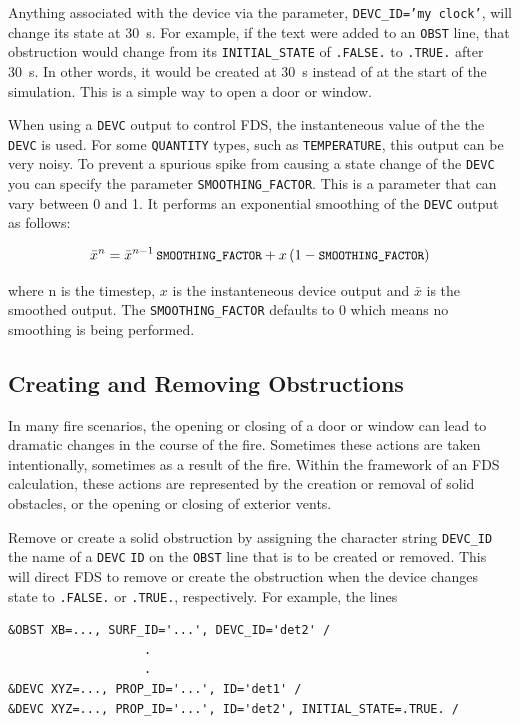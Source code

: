 \documentclass[11pt]{book}
\newcommand{\ct}{\tt\small}
\newcommand{\be}{\begin{equation}}
\newcommand{\ee}{\end{equation}}
\begin{document}
\noindent
Anything associated with the device via the parameter, {\ct DEVC\_ID='my clock'}, will change its state at 30~s. For example,
if the text were added to an {\ct OBST} line, that obstruction would change from its {\ct INITIAL\_STATE} of {\ct .FALSE.} to {\ct .TRUE.} after
30~s. In other words, it would be created at 30~s instead of at the start of the simulation. This is a simple way to open a door or window.

When using a {\ct DEVC} output to control FDS, the instanteneous value of the the {\ct DEVC} is used.  For some {\ct QUANTITY} types, such as {\ct TEMPERATURE}, this output can be very noisy.  To prevent a spurious spike from causing a state change of the {\ct DEVC} you can specify the parameter {\ct SMOOTHING\_FACTOR}.  This is a parameter that can vary between 0 and 1.  It performs an exponential smoothing of the {\ct DEVC} output as follows:

\be
\bar{x}^n=\bar{x}^{n-1} \, \mbox{\ct SMOOTHING\_FACTOR} + x \,(1-\mbox{\ct SMOOTHING\_FACTOR})
\ee

\noindent
where n is the timestep, $x$ is the instanteneous device output and $\bar{x}$ is the smoothed output.  The {\ct SMOOTHING\_FACTOR} defaults to 0 which means no smoothing is being performed.

\subsection{Creating and Removing Obstructions}
\label{info:create_remove}

In many fire scenarios, the opening or closing of a door or window
can lead to dramatic changes in the course of the fire. Sometimes these
actions are taken intentionally, sometimes as a result of the fire.
Within the framework of an FDS calculation, these actions are
represented by the creation or removal of solid obstacles, or the
opening or closing of exterior vents.

Remove or create a solid obstruction by assigning the character string {\ct DEVC\_ID} the name of
a {\ct DEVC} {\ct ID} on the {\ct OBST} line that is to be created or removed.  This will direct
FDS to remove or create the obstruction when
the device changes state to {\ct .FALSE.} or {\ct .TRUE.}, respectively. For example, the lines

\footnotesize
\begin{verbatim}
&OBST XB=..., SURF_ID='...', DEVC_ID='det2' /
                   .
                   .
&DEVC XYZ=..., PROP_ID='...', ID='det1' /
&DEVC XYZ=..., PROP_ID='...', ID='det2', INITIAL_STATE=.TRUE. /
\end{verbatim}
\normalsize
\end{document}
